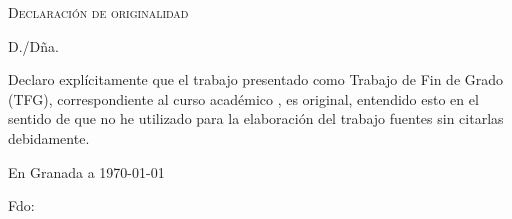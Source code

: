 %

\thispagestyle{empty}
\makeatletter

\hfill\vfill

\textsc{Declaración de originalidad}\\\bigskip

D./Dña. \@author \\\medskip

Declaro explícitamente que el trabajo presentado como Trabajo de Fin de Grado (TFG), correspondiente al curso académico \ugrTFG@academicYear, es original, entendido esto en el sentido de que no he utilizado para la elaboración del trabajo fuentes sin citarlas debidamente.
\medskip

En Granada a \today
\vspace{3cm}
\begin{center}
  Fdo: \@author

\end{center}

\vfill

\makeatother
\cleardoublepage
\endinput
